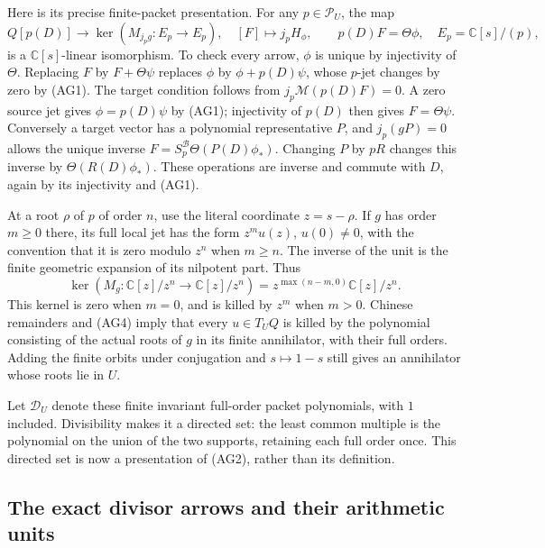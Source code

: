 Here is its precise finite-packet presentation.  For any $p\in
\mathcal P_U$, the map
\[
 Q[p(D)]\longrightarrow\ker(M_{j_pg}:E_p\to E_p),\quad
 [F]\longmapsto j_pH_\phi,
 \qquad p(D)F=\Theta\phi,
 \quad E_p=\mathbb C[s]/(p),
 \tag{AG4}
\]
is a $\mathbb C[s]$-linear isomorphism.  To check every arrow,
$\phi$ is unique by injectivity of $\Theta$.  Replacing $F$ by
$F+\Theta\psi$ replaces $\phi$ by $\phi+p(D)\psi$, whose
$p$-jet changes by zero by (AG1).  The target condition follows from
$j_p\mathcal M(p(D)F)=0$.  A zero source jet gives
$\phi=p(D)\psi$ by (AG1); injectivity of $p(D)$ then gives
$F=\Theta\psi$.  Conversely a target vector has a polynomial
representative $P$, and $j_p(gP)=0$ allows the unique inverse
$F=S_p^{\mathscr B}\Theta(P(D)\phi_*)$.  Changing $P$ by $pR$
changes this inverse by $\Theta(R(D)\phi_*)$.  These operations
are inverse and commute with $D$, again by its injectivity and (AG1).

At a root $\rho$ of $p$ of order $n$, use the literal coordinate
$z=s-\rho$.  If $g$ has order $m\ge0$ there, its full local jet
has the form $z^m u(z)$, $u(0)\ne0$, with the convention that it
is zero modulo $z^n$ when $m\ge n$.  The inverse of the unit
is the finite geometric expansion of its nilpotent part.  Thus
\[
 \ker(M_g:\mathbb C[z]/z^n\to\mathbb C[z]/z^n)
       =z^{\max(n-m,0)}\mathbb C[z]/z^n.
 \tag{AG5}
\]
This kernel is zero when $m=0$, and is killed by $z^m$ when
$m>0$.  Chinese remainders and (AG4) imply that every $u\in T_UQ$
is killed by the polynomial consisting of the actual roots of $g$
in its finite annihilator, with their full orders.  Adding the
finite orbits under conjugation and $s\mapsto1-s$ still gives an
annihilator whose roots lie in $U$.

Let $\mathcal D_U$ denote these finite invariant full-order packet
polynomials, with $1$ included.  Divisibility makes it a directed
set: the least common multiple is the polynomial on the union of
the two supports, retaining each full order once.  This directed
set is now a presentation of (AG2), rather than its definition.

\subsection{The exact divisor arrows and their arithmetic units}

